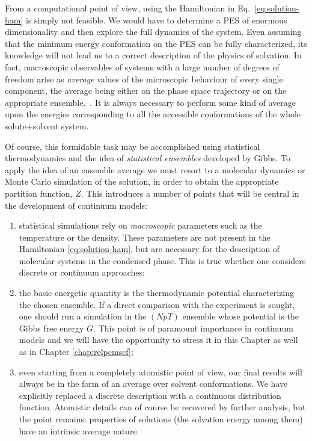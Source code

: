 From a computational point of view, using the Hamiltonian in Eq.~\eqref{eq:solution-ham} is simply not feasible. We would have to
determine a \acs{PES} of enormous dimensionality and then explore the full
dynamics of the system. Even assuming that the minimum energy
conformation on the \acs{PES} can be fully characterized, its knowledge will
not lead us to a correct description of the physics of solvation. In
fact, macroscopic observables of systems with a large number of degrees
of freedom arise as \emph{average} values of the microscopic behaviour
of every single component, the average being either on the phase space
trajectory or on the appropriate ensemble.~\autocite{Hill1960-ql}. It is always
necessary to perform some kind of average upon the energies
corresponding to all the accessible conformations of the whole
solute+solvent system.

Of course, this formidable task may be accomplished using statistical
thermodynamics and the idea of \emph{statistical ensembles} developed by
Gibbs. To apply the idea of an ensemble average we must resort to a
molecular dynamics or Monte Carlo simulation of the solution, in order
to obtain the appropriate partition function, $Z$. This introduces a
number of points that will be central in the development of continuum
models:
\begin{enumerate}
 \item statistical simulations rely on \emph{macroscopic} parameters
   such as the temperature or the density. These parameters are not
   present in the Hamiltonian \eqref{eq:solution-ham}, but are necessary
   for the description of molecular systems in the condensed phase. This
   is true whether one considers discrete or continuum approaches;
 \item the basic energetic quantity is the thermodynamic potential
   characterizing the chosen ensemble. If a direct comparison with the
   experiment is sought, one should run a simulation in the $(NpT)$
   ensemble whose potential is the Gibbs free energy $G$. This point is
   of paramount importance in continuum models and we will have the
   opportunity to stress it in this Chapter as well as in Chapter
   \ref{chap:relpcmscf};
 \item even starting from a completely atomistic point of view, our
   final results will always be in the form of an average over solvent
   conformations. We have explicitly replaced a discrete description
   with a continuous distribution function. Atomistic details can of
   course be recovered by further analysis, but the point remains:
   properties of solutions (the solvation energy among them) have an
   intrinsic average nature.
\end{enumerate}

